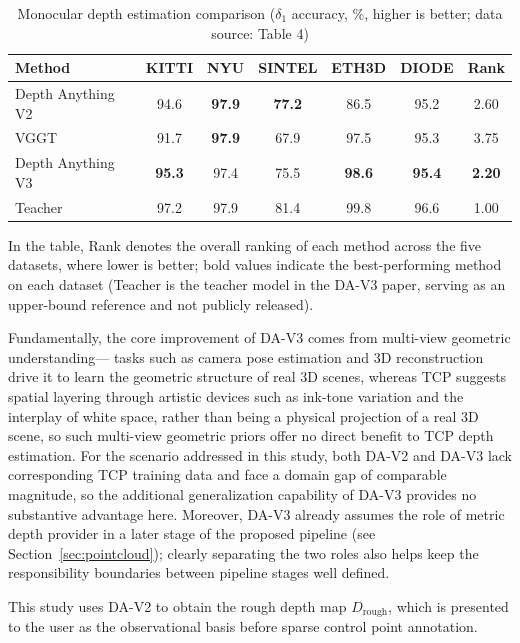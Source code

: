\begin{table}[htbp]
  \centering
  \caption{Monocular depth estimation comparison ($\delta_1$ accuracy, \%, higher is better; data source: \cite{depthanything} Table 4)}
  \label{tab:da-comparison}
  \begin{tabular}{lcccccc}
    \hline
    Method & KITTI & NYU & SINTEL & ETH3D & DIODE & Rank \\
    \hline
    Depth Anything V2 & 94.6 & \textbf{97.9} & \textbf{77.2} & 86.5          & 95.2          & 2.60 \\
    VGGT \cite{vggt}  & 91.7 & \textbf{97.9} & 67.9          & 97.5          & 95.3          & 3.75 \\
    Depth Anything V3 & \textbf{95.3} & 97.4 & 75.5 & \textbf{98.6} & \textbf{95.4} & \textbf{2.20} \\
    \hline
    Teacher           & 97.2 & 97.9 & 81.4 & 99.8 & 96.6 & 1.00 \\
    \hline
  \end{tabular}
\end{table}

In the table, Rank denotes the overall ranking of each method across the five datasets, where lower is better;
bold values indicate the best-performing method on each dataset
(Teacher is the teacher model in the DA-V3 paper, serving as an upper-bound reference and not publicly released).

Fundamentally, the core improvement of DA-V3 comes from multi-view geometric understanding---
tasks such as camera pose estimation and 3D reconstruction drive it to learn the geometric structure of real 3D scenes,
whereas TCP suggests spatial layering through artistic devices such as ink-tone variation and the interplay of white space,
rather than being a physical projection of a real 3D scene,
so such multi-view geometric priors offer no direct benefit to TCP depth estimation.
For the scenario addressed in this study,
both DA-V2 and DA-V3 lack corresponding TCP training data
and face a domain gap of comparable magnitude, so the additional generalization capability of DA-V3 provides no substantive advantage here.
Moreover, DA-V3 already assumes the role of metric depth provider in a later stage of the proposed pipeline
(see Section~\ref{sec:pointcloud});
clearly separating the two roles also helps keep the responsibility boundaries between pipeline stages well defined.

This study uses DA-V2 to obtain the rough depth map $D_{\mathrm{rough}}$,
which is presented to the user as the observational basis before sparse control point annotation.

